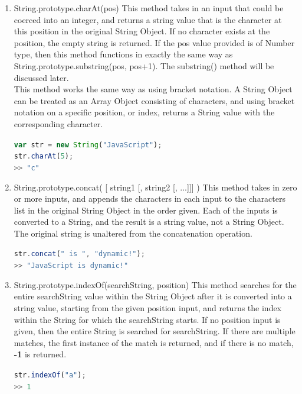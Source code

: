 \documentclass[a4paper,11pt,twoside]{report}
\def\jsinline{\lstinline[language=JavaScript, basicstyle=\small]}
\begin{document}
\begin{enumerate}
\item String.prototype.charAt(pos) \newline
This method takes in an input that could be coerced into an integer, and returns a string value that is the character at this position in the original String Object. If no character exists at the position, the empty string is returned. If the pos value provided is of Number type, then this method functions in exactly the same way as String.prototype.substring(pos, pos+1). The substring() method will be discussed later. \\
This method works the same way as using bracket notation. A String Object can be treated as an Array Object consisting of characters, and using bracket notation on a specific position, or index, returns a String value with the corresponding character.

\jsinline|var str = new String("JavaScript");| \\
\jsinline|str.charAt(5);| \\
\jsinline|>> "c"|

\item String.prototype.concat( [ string1 [, string2 [, ...]]] ) \newline
This method takes in zero or more inputs, and appends the characters in each input to the characters list in the original String Object in the order given. Each of the inputs is converted to a String, and the result is a string value, not a String Object. The original string is unaltered from the concatenation operation.

\jsinline|str.concat(" is ", "dynamic!");| \\
\jsinline|>> "JavaScript is dynamic!"|

\item String.prototype.indexOf(searchString, position) \newline
This method searches for the entire searchString value within the String Object after it is converted into a string value, starting from the given position input, and returns the index within the String for which the searchString starts. If no position input is given, then the entire String is searched for searchString. If there are multiple matches, the first instance of the match is returned, and if there is no match, \textbf{-1} is returned.

\jsinline|str.indexOf("a");| \\
\jsinline|>> 1|


\end{enumerate}
\end{document}
